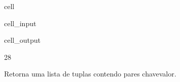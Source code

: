 \documentclass[letterpaper,10pt,english]{jupyterBook}
\begin{document}
\begin{sphinxuseclass}{cell}\begin{sphinxVerbatimInput}

\begin{sphinxuseclass}{cell_input}
\begin{sphinxVerbatim}[commandchars=\\\{\}]
     
  
\end{sphinxVerbatim}

\end{sphinxuseclass}\end{sphinxVerbatimInput}
\begin{sphinxVerbatimOutput}

\begin{sphinxuseclass}{cell_output}
\begin{sphinxVerbatim}[commandchars=\\\{\}]
28
\end{sphinxVerbatim}

\end{sphinxuseclass}\end{sphinxVerbatimOutput}

\end{sphinxuseclass}
\sphinxAtStartPar
{}
Retorna uma lista de tuplas contendo pares chave\sphinxhyphen{}valor.
\end{document}
